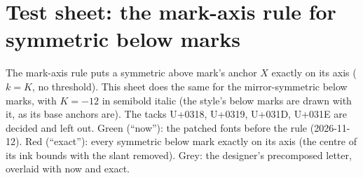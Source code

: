 \documentclass[10pt]{article}
\begin{document}
\section*{Test sheet: the mark-axis rule for symmetric below marks}
The mark-axis rule puts a symmetric above mark's anchor $X$ exactly on its axis ($k = K$, no threshold).
This sheet does the same for the mirror-symmetric below marks, with $K = -12$ in semibold italic (the style's below marks are drawn with it, as its base anchors are).
The tacks U+0318, U+0319, U+031D, U+031E are decided and left out.
{\color{now}Green} (``now''): the patched fonts before the rule (2026-11-12). {\color{ex}Red} (``exact''): every symmetric below mark exactly on its axis (the centre of its ink bounds with the slant removed).
{\color{pre}Grey}: the designer's precomposed letter, overlaid with now and exact.
\end{document}

